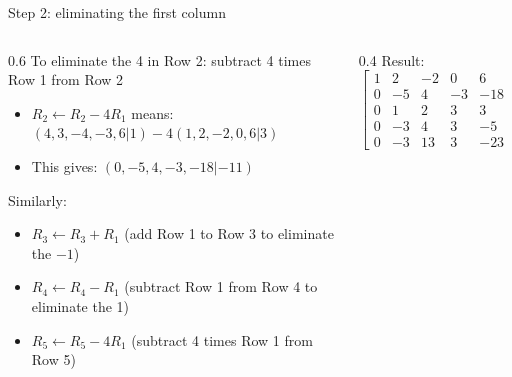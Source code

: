 \ifdefined\PRESENTATION\else\PassOptionsToClass{handout}{beamer}\fi\documentclass[aspectratio=169, lualatex]{beamer}
\begin{document}
\begin{frame}{Step 2: eliminating the first column}
	\begin{columns}[c]
		\begin{column}{0.6\textwidth}
			To eliminate the 4 in Row 2: subtract 4 times Row 1 from Row 2
			\begin{itemize}
				\item $R_2 \leftarrow R_2 - 4R_1$ means: $(4, 3, -4, -3, 6 | 1) - 4(1, 2, -2, 0, 6 | 3)$
				\item This gives: $(0, -5, 4, -3, -18 | -11)$
			\end{itemize}

			Similarly:
			\begin{itemize}
				\item $R_3 \leftarrow R_3 + R_1$ (add Row 1 to Row 3 to eliminate the $-1$)
				\item $R_4 \leftarrow R_4 - R_1$ (subtract Row 1 from Row 4 to eliminate the 1)
				\item $R_5 \leftarrow R_5 - 4R_1$ (subtract 4 times Row 1 from Row 5)
			\end{itemize}
		\end{column}
		\begin{column}{0.4\textwidth}
			Result:
			\[
				\left[\begin{array}{ccccc|c}
						1 & 2  & -2 & 0  & 6   & 3   \\
						0 & -5 & 4  & -3 & -18 & -11 \\
						0 & 1  & 2  & 3  & 3   & 7   \\
						0 & -3 & 4  & 3  & -5  & -2  \\
						0 & -3 & 13 & 3  & -23 & -7
					\end{array}\right]
			\]
		\end{column}
	\end{columns}
\end{frame}
\end{document}
